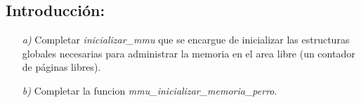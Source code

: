 \subsection{Introducción:}

\begin{itemize}
\item [\textit{a)}] Completar \textit{inicializar\_mmu} que se encargue de inicializar las estructuras globales necesarias para administrar la memoria en el area libre (un contador de páginas libres).
\item [\textit{b)}] Completar la funcion \textit{mmu\_inicializar\_memoria\_perro}.
\end{itemize}













